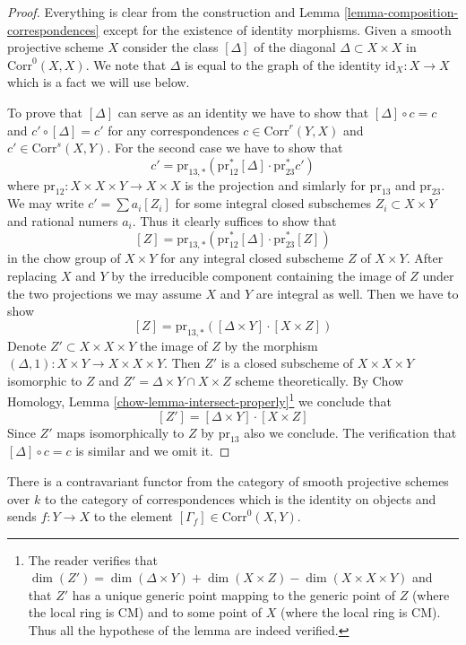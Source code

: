 \begin{proof}
Everything is clear from the construction and
Lemma \ref{lemma-composition-correspondences}
except for the existence of identity morphisms.
Given a smooth projective scheme $X$ consider
the class $[\Delta]$ of the diagonal $\Delta \subset X \times X$
in $\text{Corr}^0(X, X)$. We note that $\Delta$ is
equal to the graph of the identity $\text{id}_X : X \to X$
which is a fact we will use below.

\medskip\noindent
To prove that $[\Delta]$ can serve as an identity we have to show that
$[\Delta] \circ c = c$ and $c' \circ [\Delta] = c'$ for any correspondences
$c \in \text{Corr}^r(Y, X)$ and $c' \in \text{Corr}^s(X, Y)$.
For the second case we have to show that
$$
c' = \text{pr}_{13, *}(\text{pr}_{12}^*[\Delta] \cdot \text{pr}_{23}^*c')
$$
where $\text{pr}_{12} : X \times X \times Y \to X \times X$ is the
projection and simlarly for $\text{pr}_{13}$ and $\text{pr}_{23}$.
We may write $c' = \sum a_i [Z_i]$ for some integral closed subschemes
$Z_i \subset X \times Y$ and rational numers $a_i$. Thus it clearly
suffices to show that
$$
[Z] = \text{pr}_{13, *}(\text{pr}_{12}^*[\Delta] \cdot \text{pr}_{23}^*[Z])
$$
in the chow group of $X \times Y$ for any integral closed subscheme $Z$
of $X \times Y$. After replacing $X$ and $Y$ by the
irreducible component containing the image of $Z$ under the two projections
we may assume $X$ and $Y$ are integral as well. Then we have to show
$$
[Z] = \text{pr}_{13, *}([\Delta \times Y] \cdot [X \times Z])
$$
Denote $Z' \subset X \times X \times Y$ the image of $Z$ by the morphism
$(\Delta, 1) : X \times Y \to X \times X \times Y$. Then $Z'$
is a closed subscheme of $X \times X \times Y$ isomorphic to $Z$ and
$Z' = \Delta \times Y \cap X \times Z$ scheme theoretically.
By Chow Homology, Lemma \ref{chow-lemma-intersect-properly}\footnote{The
reader verifies that $\dim(Z') = \dim(\Delta \times Y) + \dim(X \times Z) -
\dim(X \times X \times Y)$ and that $Z'$ has a unique generic point
mapping to the generic point of $Z$ (where the local ring is CM)
and to some point of $X$ (where the local ring is CM). Thus all the
hypothese of the lemma are indeed verified.}
we conclude that
$$
[Z'] = [\Delta \times Y] \cdot [X \times Z]
$$
Since $Z'$ maps isomorphically to $Z$ by $\text{pr}_{13}$ also
we conclude. The verification that
$[\Delta] \circ c = c$ is similar and we omit it.
\end{proof}

\begin{lemma}
\label{lemma-contravariant-functor}
There is a contravariant functor from the category of smooth
projective schemes over $k$ to the category of correspondences
which is the identity on objects and sends $f : Y \to X$ to
the element $[\Gamma_f] \in \text{Corr}^0(X, Y)$.
\end{lemma}

